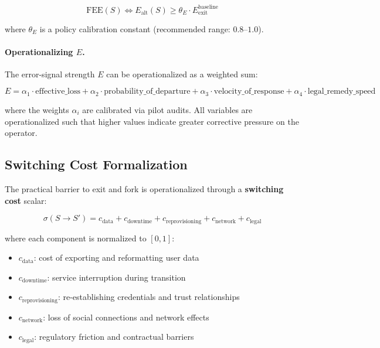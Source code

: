 \documentclass{article}
\begin{document}
\begin{equation}
\text{FEE}(S) \iff E_{\text{alt}}(S) \geq \theta_E \cdot E_{\text{exit}}^{\text{baseline}}
\label{eq:fee}
\end{equation}

where $\theta_E$ is a policy calibration constant (recommended range: $0.8$--$1.0$).

\paragraph{Operationalizing $E$.} The error-signal strength $E$ can be operationalized as a weighted sum:

\begin{equation}
E = \alpha_1 \cdot \text{effective\_loss} + \alpha_2 \cdot \text{probability\_of\_departure} + \alpha_3 \cdot \text{velocity\_of\_response} + \alpha_4 \cdot \text{legal\_remedy\_speed}
\label{eq:error-signal}
\end{equation}

where the weights $\alpha_i$ are calibrated via pilot audits. All variables are operationalized such that higher values indicate greater corrective pressure on the operator.

\subsection{Switching Cost Formalization}

The practical barrier to exit and fork is operationalized through a \textbf{switching cost} scalar:

\begin{equation}
\sigma(S \to S') = c_{\text{data}} + c_{\text{downtime}} + c_{\text{reprovisioning}} + c_{\text{network}} + c_{\text{legal}}
\label{eq:switching-cost}
\end{equation}

where each component is normalized to $[0,1]$:
\begin{itemize}[noitemsep]
    \item $c_{\text{data}}$: cost of exporting and reformatting user data
    \item $c_{\text{downtime}}$: service interruption during transition
    \item $c_{\text{reprovisioning}}$: re-establishing credentials and trust relationships
    \item $c_{\text{network}}$: loss of social connections and network effects
    \item $c_{\text{legal}}$: regulatory friction and contractual barriers
\end{itemize}
\end{document}
